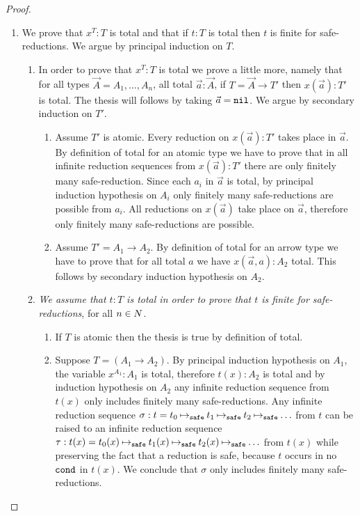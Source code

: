 \begin{proof}
\begin{enumerate}
\item
We prove that $x^T:T$ is total and that 
if $t:T$ is total then $t$ is finite for safe-reductions.
We argue by principal induction on $T$.
\begin{enumerate}
\item
In order to prove that $x^T:T$ is total we prove a little more, namely
that for all types $\vec{A} = A_1, \ldots, A_n$, 
all total $\vec{a}:\vec{A}$, if $T = \vec{A} \rightarrow T'$ then $x(\vec{a}):T'$
is total. The thesis will follows by taking $\vec{a} = {\tt nil}$. 
We argue by secondary induction on $T'$. 
\begin{enumerate}
\item
Assume $T'$ is atomic. Every reduction on $x(\vec{a}):T'$
takes place in $\vec{a}$. By definition of total
for an atomic type we have to prove that in all infinite reduction sequences from $x(\vec{a}):T'$ 
there are only finitely many safe-reduction. 
Since each $a_i$ in $\vec{a}$ is total, by principal induction hypothesis on $A_i$ 
only finitely many safe-reductions are possible from $a_i$. 
All reductions on $x(\vec{a})$ take place on $\vec{a}$, therefore
only finitely many safe-reductions are possible. 
\item
Assume $T' = A_1 \to A_2$. By definition of total
for an arrow type we have to prove that for all total $a$ we have  $x(\vec{a},a):A_2$ total.
This follows by secondary induction hypothesis on $A_2$.
\end{enumerate}

\item
\emph{We assume that  $t:T$ is total in order to prove that $t$ is finite for safe-reductions},
for all $n \in {N}$.
\begin{enumerate}
\item
If $T$ is atomic then the thesis is true by definition of total.
\item
Suppose $T = (A_1 \rightarrow A_2)$. By principal induction hypothesis on $A_1$,
the variable 
$x^{A_1}:A_1$ is total, therefore $t(x):A_2$ is total and by induction hypothesis on $A_2$
any infinite reduction sequence from $t(x)$ only includes finitely many safe-reductions. 
Any infinite reduction sequence 
$\sigma: t = t_0 \mathbin{\mathbin{\mapsto}_{\hbox{\scriptsize \tt safe}}} t_1 \mathbin{\mathbin{\mapsto}_{\hbox{\scriptsize \tt safe}}} t_2 \mathbin{\mathbin{\mapsto}_{\hbox{\scriptsize \tt safe}}} \ldots$  from $t$ 
can be raised to an infinite reduction sequence 
$\tau: t(x) = t_0(x) \mathbin{\mathbin{\mapsto}_{\hbox{\scriptsize \tt safe}}} t_1(x) \mathbin{\mathbin{\mapsto}_{\hbox{\scriptsize \tt safe}}} t_2(x) \mathbin{\mathbin{\mapsto}_{\hbox{\scriptsize \tt safe}}} \ldots$ from $t(x)$
while preserving the fact that a reduction is safe, because $t$ occurs in no ${\tt cond}$ in $t(x)$.
We conclude that $\sigma$ only includes finitely many safe-reductions. 
\end{enumerate}
\end{enumerate}


\end{enumerate}
\end{proof}
